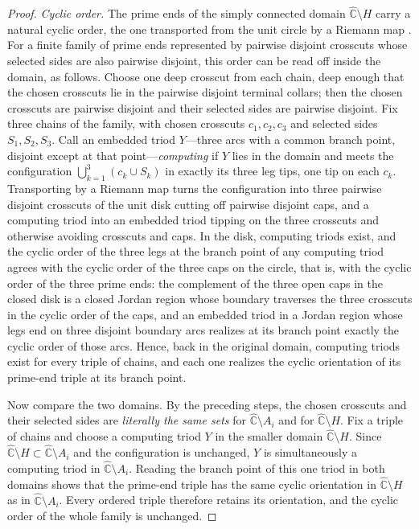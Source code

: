 \documentclass[11pt,reqno]{amsart}
\theoremstyle{definition}
\theoremstyle{remark}
\newcommand{\Chat}{\widehat{\mathbb C}}
\begin{document}
\begin{proof}
\emph{Cyclic order.}
The prime ends of the simply connected domain $\Chat\setminus H$ carry a
natural cyclic order, the one transported from the unit circle by a
Riemann map \cite{Pom92}.  For a finite family of prime ends represented
by pairwise disjoint crosscuts whose selected sides are also pairwise
disjoint, this order can be read off inside the domain, as follows.
Choose one deep crosscut from each chain, deep enough that the chosen
crosscuts lie in the pairwise disjoint terminal collars; then the chosen
crosscuts are pairwise disjoint and their selected sides are pairwise
disjoint.  Fix three chains of the family, with chosen crosscuts
$c_1,c_2,c_3$ and selected sides $S_1,S_2,S_3$.  Call an embedded triod
$Y$---three arcs with a common branch point, disjoint except at that
point---\emph{computing} if $Y$ lies in the domain and meets the
configuration $\bigcup_{k=1}^{3}(c_k\cup S_k)$ in exactly its three leg
tips, one tip on each $c_k$.  Transporting by a Riemann map turns the
configuration into three pairwise disjoint crosscuts of the unit disk
cutting off pairwise disjoint caps, and a computing triod into an
embedded triod tipping on the three crosscuts and otherwise avoiding
crosscuts and caps.  In the disk, computing triods exist, and the cyclic
order of the three legs at the branch point of any computing triod
agrees with the cyclic order of the three caps on the circle, that is,
with the cyclic order of the three prime ends: the complement of the
three open caps in the closed disk is a closed Jordan region whose
boundary traverses the three crosscuts in the cyclic order of the caps,
and an embedded triod in a Jordan region whose legs end on three
disjoint boundary arcs realizes at its branch point exactly the cyclic
order of those arcs.  Hence, back in the original domain, computing
triods exist for every triple of chains, and each one realizes the
cyclic orientation of its prime-end triple at its branch point.

Now compare the two domains.  By the preceding steps, the chosen
crosscuts and their selected sides are \emph{literally the same sets}
for $\Chat\setminus A_i$ and for $\Chat\setminus H$.  Fix a triple of
chains and choose a computing triod $Y$ in the smaller domain
$\Chat\setminus H$.  Since $\Chat\setminus H\subset\Chat\setminus A_i$
and the configuration is unchanged, $Y$ is simultaneously a computing
triod in $\Chat\setminus A_i$.  Reading the branch point of this one
triod in both domains shows that the prime-end triple has the same
cyclic orientation in $\Chat\setminus H$ as in $\Chat\setminus A_i$.
Every ordered triple therefore retains its orientation, and the cyclic
order of the whole family is unchanged.
\end{proof}
\end{document}
